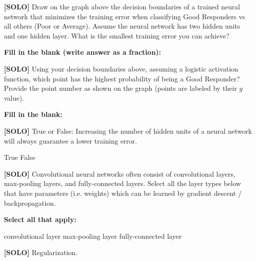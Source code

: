 \documentclass[11pt,addpoints,answers]{exam}
\newcommand{\solo}{\textbf{[SOLO]} }
\begin{document}
\begin{questions}
    \question[3] \solo Draw on the graph above the decision boundaries of a trained neural network that minimizes the training error when classifying Good Responders vs all others (Poor or Average). Assume the neural network has two hidden units and one hidden layer. What is the smallest training error you can achieve?
    
        \textbf{Fill in the blank (write answer as a fraction):}
    
    \begin{tcolorbox}[fit,height=1cm, width=4cm, blank, borderline={1pt}{-2pt},nobeforeafter]
    \end{tcolorbox}
    
    
    \question[2] \solo Using your decision boundaries above, assuming a logistic activation function, which point has the highest probability of being a Good Responder? Provide the point number as shown on the graph (points are labeled by their $y$ value).
    
            \textbf{Fill in the blank:}
    
    \begin{tcolorbox}[fit,height=1cm, width=4cm, blank, borderline={1pt}{-2pt},nobeforeafter]
    \end{tcolorbox}
    
    
    \question[2] \solo True or False: Increasing the number of hidden units of a neural network will always guarantee a lower training error. 
    
    \begin{checkboxes}
        \choice True
        \choice False
    \end{checkboxes}
    


    \question[2] \solo Convolutional neural networks often consist of convolutional layers, max-pooling layers, and fully-connected layers. Select all the layer types below that have parameters (i.e. weights) which can be learned by gradient descent / backpropagation.
    
    \textbf{Select all that apply:}
    {
    \checkboxchar{$\Box$} \checkedchar{$\blacksquare$}
        \begin{checkboxes}
            \choice convolutional layer
            \choice max-pooling layer
            \choice fully-connected layer
        \end{checkboxes}
    }
    
    \question[2] \solo Regularization.


\end{questions}
\end{document}
